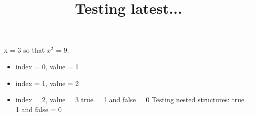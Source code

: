 \documentclass{article}
\title{Testing latest...}
\begin{document}
x = 3 so that $x^2$ = 9.
\begin{itemize}
\item index = 0, value = 1
\item index = 1, value = 2
\item index = 2, value = 3
true = 1 and false = 0
Testing nested structures:
true = 1 and false = 0
\end{itemize}
\end{document}
